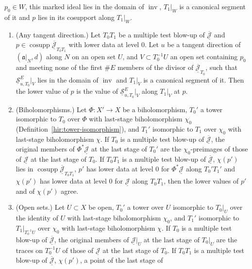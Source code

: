 \begin{theorem}
\(p_0\in W\), this marked ideal lies in the domain of \(\operatorname{inv}\), \(T_1|_W\) is a canonical segment of it and \(p\) lies in its cosupport along \(T_1|_W\).
\begin{enumerate}
\item (Any tangent direction.) Let \(T_0T_1\) be a multiple test blow-up of \(\overline{\underline{\mathcal J}}\) and \(p\in\operatorname{cosupp}\overline{\underline{\mathcal J}}_{T_0T_1}\)
with lower data at level \(0\). Let \(u\) be a tangent direction of \((\mathfrak a|_N,d)\) along \(N\) on an open set \(U\), and \(V\subset T_0^{-1}U\) an open set containing
\(p_0\) and meeting none of the first \(\#E\) members of the divisor of \(\overline{\underline{\mathcal J}}_{T_0}\), such that \(\underline{\mathcal S}^E_{u,T_0}|_V\) lies in the
domain of \(\operatorname{inv}\) and \(T_1|_V\) is a canonical segment of it. Then the lower value of \(p\) is the value of \(\underline{\mathcal S}^E_{u,T_0}|_V\) along
\(T_1|_V\) at \(p\).
\item (Biholomorphisms.) Let \(\Phi\colon X'\to X\) be a biholomorphism, \(T_0'\) a tower isomorphic to \(T_0\) over \(\Phi\) with last-stage biholomorphism \(\chi_0\)
(Definition~\ref{hir:tower-isomorphism}), and \(T_1'\) isomorphic to \(T_1\) over \(\chi_0\) with last-stage biholomorphism \(\chi\). If \(T_0\) is a multiple test blow-up of
\(\overline{\underline{\mathcal J}}\), the original members of \(\Phi^*\underline{\mathcal J}\) at the last stage of \(T_0'\) are the \(\chi_0\)-preimages of those of
\(\underline{\mathcal J}\) at the last stage of \(T_0\). If \(T_0T_1\) is a multiple test blow-up of \(\overline{\underline{\mathcal J}}\), \(\chi(p')\) lies in
\(\operatorname{cosupp}\overline{\underline{\mathcal J}}_{T_0T_1}\), \(p'\) has lower data at level \(0\) for \(\Phi^*\underline{\mathcal J}\) along \(T_0'T_1'\) and \(\chi(p')\)
has lower data at level \(0\) for \(\underline{\mathcal J}\) along \(T_0T_1\), then the lower values of \(p'\) and of \(\chi(p')\) agree.
\item (Open sets.) Let \(U\subset X\) be open, \(T_0'\) a tower over \(U\) isomorphic to \(T_0|_U\) over the identity of \(U\) with last-stage biholomorphism
\(\chi_0\), and \(T_1'\) isomorphic to \(T_1|_{T_0^{-1}U}\) over \(\chi_0\) with last-stage biholomorphism \(\chi\). If \(T_0\) is a multiple test blow-up of
\(\overline{\underline{\mathcal J}}\), the original members of \(\underline{\mathcal J}|_U\) at the last stage of \(T_0|_U\) are the traces on \(T_0^{-1}U\) of those of
\(\underline{\mathcal J}\) at the last stage of \(T_0\). If \(T_0T_1\) is a multiple test blow-up of \(\overline{\underline{\mathcal J}}\), \(\chi(p')\), a point of the last stage of

\end{enumerate}
\end{theorem}
